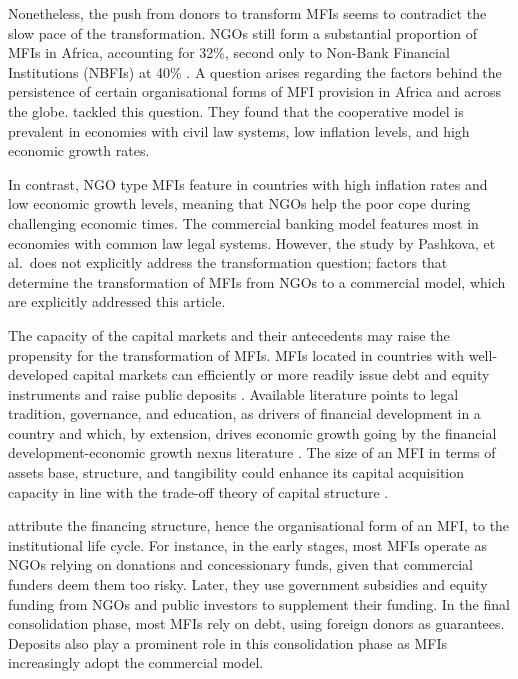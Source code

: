 \documentclass[a4paper,nobind]{templates/ociamthesis}
\begin{document}
Nonetheless, the push from donors to transform MFIs seems to contradict the slow pace of the transformation. NGOs still form a substantial proportion of MFIs in Africa, accounting for 32\%, second only to Non-Bank Financial Institutions (NBFIs) at 40\% \autocite{market2018global}. A question arises regarding the factors behind the persistence of certain organisational forms of MFI provision in Africa and across the globe. \textcite{pashkova2016business} tackled this question. They found that the cooperative model is prevalent in economies with civil law systems, low inflation levels, and high economic growth rates.

In contrast, NGO type MFIs feature in countries with high inflation rates and low economic growth levels, meaning that NGOs help the poor cope during challenging economic times. The commercial banking model features most in economies with common law legal systems. However, the study by Pashkova, et al.~does not explicitly address the transformation question; factors that determine the transformation of MFIs from NGOs to a commercial model, which are explicitly addressed this article.

The capacity of the capital markets and their antecedents may raise the propensity for the transformation of MFIs. MFIs located in countries with well-developed capital markets can efficiently or more readily issue debt and equity instruments and raise public deposits \autocite{allen2013resolving,allen2014african}. Available literature points to legal tradition, governance, and education, as drivers of financial development in a country \autocite{rajan1998financial,baltagi2009financial} and which, by extension, drives economic growth going by the financial development-economic growth nexus literature \autocite{claessens2003financial}. The size of an MFI in terms of assets base, structure, and tangibility could enhance its capital acquisition capacity in line with the trade-off theory of capital structure \autocite{barclay2005capital,gwatidzo2009corporate,ojah2016effects}.

\textcite{ledgerwood2006transforming} attribute the financing structure, hence the organisational form of an MFI, to the institutional life cycle. For instance, in the early stages, most MFIs operate as NGOs relying on donations and concessionary funds, given that commercial funders deem them too risky. Later, they use government subsidies and equity funding from NGOs and public investors to supplement their funding. In the final consolidation phase, most MFIs rely on debt, using foreign donors as guarantees. Deposits also play a prominent role in this consolidation phase as MFIs increasingly adopt the commercial model.
\end{document}
